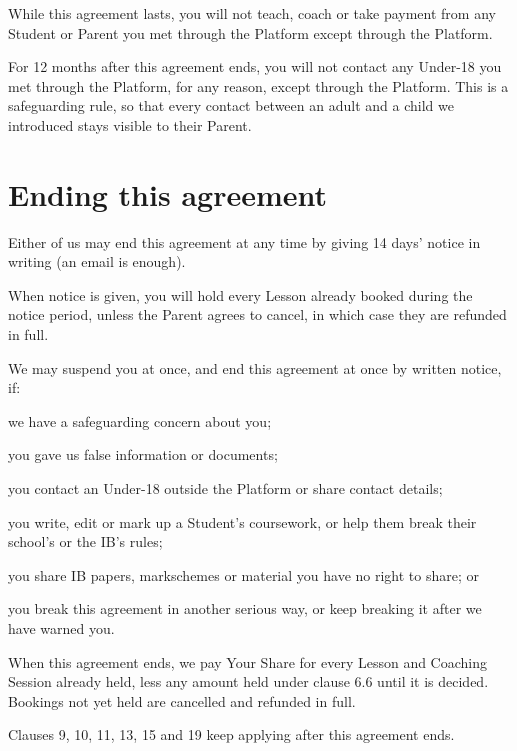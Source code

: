 \documentclass[11pt]{article}
\begin{document}
\begin{clauses}
  \item While this agreement lasts, you will not teach, coach or take payment from any Student or Parent you met through the Platform except through the Platform.
  \item For 12 months after this agreement ends, you will not contact any Under-18 you met through the Platform, for any reason, except through the Platform. This is a safeguarding rule, so that every contact between an adult and a child we introduced stays visible to their Parent.
\end{clauses}

\section{Ending this agreement}

\begin{clauses}
  \item Either of us may end this agreement at any time by giving 14 days' notice in writing (an email is enough).
  \item When notice is given, you will hold every Lesson already booked during the notice period, unless the Parent agrees to cancel, in which case they are refunded in full.
  \item We may suspend you at once, and end this agreement at once by written notice, if:
  \begin{clauses}
    \item we have a safeguarding concern about you;
    \item you gave us false information or documents;
    \item you contact an Under-18 outside the Platform or share contact details;
    \item you write, edit or mark up a Student's coursework, or help them break their school's or the IB's rules;
    \item you share IB papers, markschemes or material you have no right to share; or
    \item you break this agreement in another serious way, or keep breaking it after we have warned you.
  \end{clauses}
  \item When this agreement ends, we pay Your Share for every Lesson and Coaching Session already held, less any amount held under clause 6.6 until it is decided. Bookings not yet held are cancelled and refunded in full.
  \item Clauses 9, 10, 11, 13, 15 and 19 keep applying after this agreement ends.
\end{clauses}
\end{document}
